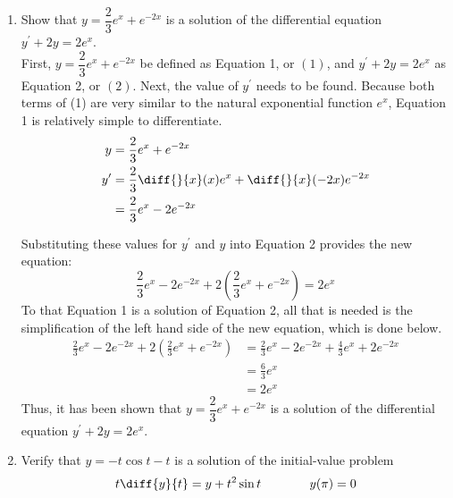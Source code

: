 \documentclass{article}
\begin{document}
\begin{enumerate}[label=\textbf{\arabic*.}]
\item Show that $y=\dfrac{2}{3}e^x+e^{-2x}$ is a solution of the differential equation $y^\prime+2y=2e^x$.\\


\vspace{5pt}
First, $y=\dfrac{2}{3}e^x+e^{-2x}$ be defined as Equation 1, or $(1)$, and $y^\prime+2y=2e^x$ as Equation 2, or $(2)$. Next, the value of $y^\prime$ needs to be found. Because both terms of (1) are very similar to the natural exponential function $e^x$, Equation 1 is relatively simple to differentiate.
\begin{align*}
y &= \frac{2}{3}e^x+e^{-2x}\\
y^\prime &= \frac{2}{3}\diff{}{x}(x)e^x+\diff{ }{x}(-2x)e^{-2x}\\
&= \frac{2}{3}e^x-2e^{-2x}
\end{align*}

Substituting these values for $y^\prime$ and $y$ into Equation 2 provides the new equation:
\[\frac{2}{3}e^x-2e^{-2x} + 2\left(\frac{2}{3}e^x+e^{-2x}\right) =  2e^x\] 
To that Equation 1 is a solution of Equation 2, all that is needed is the simplification of the left hand side of the new equation, which is done below.
\begin{align*}
\frac{2}{3}e^x-2e^{-2x} + 2\left(\frac{2}{3}e^x+e^{-2x}\right) &= \frac{2}{3}e^x-2e^{-2x} +  \frac{4}{3}e^x+2e^{-2x}\\
&= \frac{6}{3}e^x\\
&= 2e^x
\end{align*}
Thus, it has been shown that $y=\dfrac{2}{3}e^x+e^{-2x}$ is a solution of the differential equation $y^\prime+2y=2e^x$.
\newpage

\item Verify that $y = -t\cos t - t$ is a solution of the initial-value problem 
\[t\diff{y}{t} = y+t^2\sin t \;\;\;\;\;\;\;\;\;\;\;\;\;\; y(\pi)=0\]



\end{enumerate}
\end{document}
